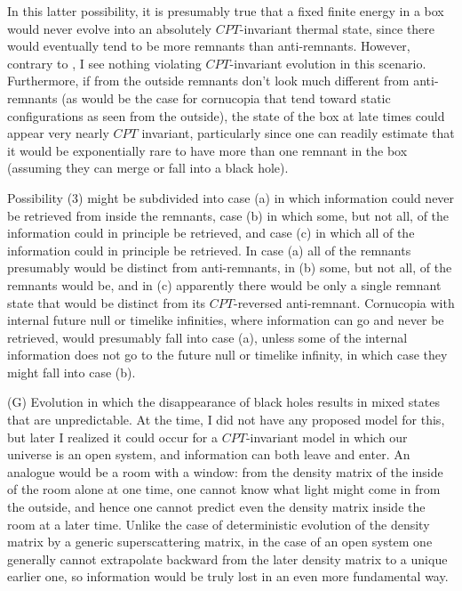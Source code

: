      In this latter possibility, it is presumably true
\cite{HawHay,Haw93pri} that a fixed finite energy in a box would
never evolve into an absolutely $CPT$-invariant thermal state,
since there would eventually tend to be more remnants than
anti-remnants.  However, contrary to \cite{HawHay,Haw93pri},
I see nothing violating $CPT$-invariant evolution in this
scenario.  Furthermore, if from the outside remnants don't look
much different from anti-remnants (as would be the case for
cornucopia that tend toward static configurations as seen from
the outside), the state of the box at late
times could appear very nearly $CPT$ invariant, particularly
since one can readily estimate that it would be exponentially
rare to have more than one remnant in the box (assuming
they can merge or fall into a black hole).

     Possibility (3) might be subdivided into case (a) in which
information could never be retrieved from inside the remnants,
case (b) in which some, but not all, of the information could
in principle be retrieved, and case (c) in which all of the
information could in principle be retrieved.  In case (a) all
of the remnants presumably would be distinct from
anti-remnants, in (b) some, but not all, of the remnants would
be, and in (c) apparently there would be only a single remnant
state that would be distinct from its $CPT$-reversed
anti-remnant.  Cornucopia with internal future null or timelike
infinities, where information can go and never be retrieved,
would presumably fall into case (a), unless some of the internal
information does not go to the future null or timelike infinity,
in which case they might fall into case (b).

     (G) Evolution in which the disappearance of black holes results
in mixed
states that are unpredictable.  At the time, I did not have any
proposed model
for this, but later I realized \cite{Pag82,Pag83} it could occur for
a
$CPT$-invariant model in which our universe is an open system, and
information
can both leave and enter.  An analogue would be a room with a window:
from the
density matrix of the inside of the room alone at one time, one
cannot know
what light might come in from the outside, and hence one cannot
predict even
the density matrix inside the room at a later time.  Unlike the case
of
deterministic evolution of the density matrix by a generic
superscattering
matrix, in the case of an open system one generally cannot
extrapolate backward
from the later density matrix to a unique earlier one, so information
would be
truly lost in an even more fundamental way.

